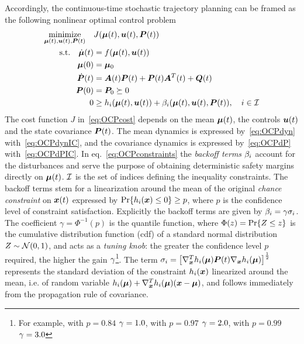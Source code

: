 Accordingly, the continuous-time stochastic trajectory planning can be framed as the following nonlinear optimal control problem
\begin{subequations}\label{eq:OCP}
\begin{align}
	\underset{\bmu(t), \bu(t), \bP(t)}{\text{minimize}} \quad & J(\bmu(t), \bu(t), \bP(t)) \label{eq:OCPcost} \\
	\text{s.t.} \quad \dbmu(t)           &= f(\bmu(t), \bu(t)) \label{eq:OCPdyn} \\
	\phantom{\text{s.t.} \quad} \bmu(0)  &= \bmu_0 \label{eq:OCPdynIC} \\
	\phantom{\text{s.t.} \quad} \dbP(t) &= \bA(t) \bP(t) + \bP(t) \bA^T(t) + \bQ(t) \label{eq:OCPdP} \\
	\phantom{\text{s.t.} \quad} \bP(0)  &= \bP_0 \succeq 0 \label{eq:OCPdPIC} \\ %
	\phantom{\text{s.t.} \qquad} 0&       \geq h_i(\bmu(t), \bu(t))
	+ \be_i(\bmu(t), \bu(t), \bP(t)),
	\quad i \in \calI \label{eq:OCPconstraints}
\end{align}
\end{subequations}
The cost function $J$ in~\eqref{eq:OCPcost} depends on the mean $\boldsymbol{\mu}(t)$, the controls $\boldsymbol{u}(t)$ and the state covariance $\boldsymbol{P}(t)$. The mean dynamics is expressed by~\eqref{eq:OCPdyn} with~\eqref{eq:OCPdynIC}, and the covariance dynamics is expressed by~\eqref{eq:OCPdP} with~\eqref{eq:OCPdPIC}. In eq.~\eqref{eq:OCPconstraints} the \emph{backoff terms} $\beta_i$ account for the disturbances and serve the purpose of obtaining deterministic safety margins directly on $\boldsymbol{\mu}(t)$. $\mathcal{I}$ is the set of indices defining the inequality constraints. The backoff terms stem for a linearization around the mean of the original \emph{chance constraint} on $\boldsymbol{x}(t)$ expressed by $\operatorname{Pr} \{h_i(\boldsymbol{x}) \leq 0\}\geq p$, where $p$ is the confidence level of constraint satisfaction. Explicitly the backoff terms are given by
$\beta_i = \gamma \sigma_i$. The coefficient $\gamma = \Phi^{-1}(p)$ is the quantile function, where $\Phi(z)=\operatorname{Pr} \{Z\leq z\}$ is the cumulative distribution function (cdf) of a standard normal distribution $Z \sim \mathcal{N}(0,1)$, and acts as a \emph{tuning knob}: the greater the confidence level $p$ required, the higher the gain $\gamma$\footnote{For example, with $p=0.84$ $\gamma = 1.0$, with $p=0.97$ $\gamma = 2.0$, with $p=0.99$ $\gamma = 3.0$}. The term $\sigma_i = \big[\nabla^T_{\boldsymbol{x}} h_i(\boldsymbol{\mu}) \boldsymbol{P}(t) \nabla_{\boldsymbol{x}} h_i(\boldsymbol{\mu})\big]^{\frac{1}{2}}$ represents the standard deviation of the constraint $h_i(\boldsymbol{x})$ linearized around the mean, i.e. of random variable $h_i(\boldsymbol{\mu})+\nabla^T_{\boldsymbol{x}} h_i(\boldsymbol{\mu}) (\boldsymbol{x} - \boldsymbol{\mu})$, and follows immediately from the propagation rule of covariance.

